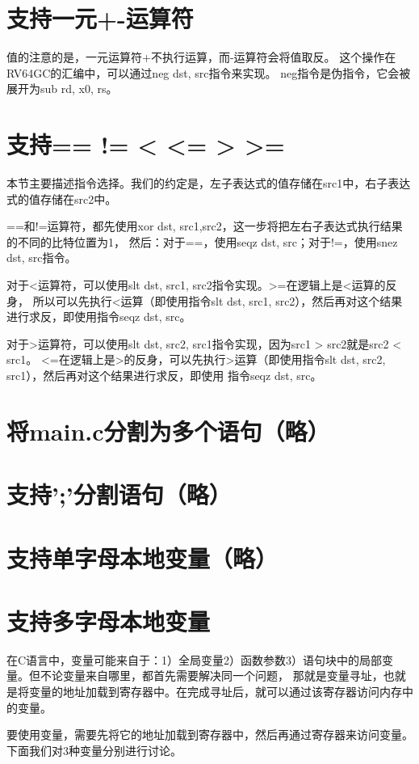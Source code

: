 \documentclass[a4paper, oneside, twocolumn]{ctexbook}
\begin{document}
\section{支持一元+-运算符}
值的注意的是，一元运算符+不执行运算，而-运算符会将值取反。
这个操作在RV64GC的汇编中，可以通过neg dst, src指令来实现。
neg指令是伪指令，它会被展开为sub rd, x0, rs。

\section{支持== != < <= > >=}
本节主要描述指令选择。我们的约定是，左子表达式的值存储在src1中，右子表达式的值存储在src2中。


==和!=运算符，都先使用xor dst, src1,src2，这一步将把左右子表达式执行结果的不同的比特位置为1，
然后：对于==，使用seqz dst, src；对于!=，使用snez dst, src指令。


对于<运算符，可以使用slt dst, src1, src2指令实现。>=在逻辑上是<运算的反身，
所以可以先执行<运算（即使用指令slt dst, src1, src2），然后再对这个结果进行求反，即使用指令seqz dst, src。

对于>运算符，可以使用slt dst, src2, src1指令实现，因为src1 > src2就是src2 < src1。
<=在逻辑上是>的反身，可以先执行>运算（即使用指令slt dst, src2, src1），然后再对这个结果进行求反，即使用
指令seqz dst, src。

\section{将main.c分割为多个语句（略）}

\section{支持';'分割语句（略）}

\section{支持单字母本地变量（略）}

\section{支持多字母本地变量}
在C语言中，变量可能来自于：1）全局变量2）函数参数3）语句块中的局部变量。但不论变量来自哪里，都首先需要解决同一个问题，
那就是变量寻址，也就是将变量的地址加载到寄存器中。在完成寻址后，就可以通过该寄存器访问内存中的变量。

要使用变量，需要先将它的地址加载到寄存器中，然后再通过寄存器来访问变量。下面我们对3种变量分别进行讨论。
\end{document}

